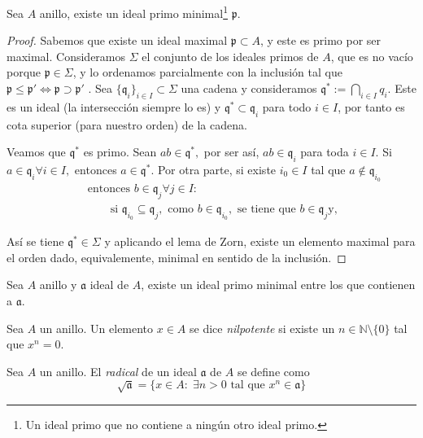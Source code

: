 \documentclass[./main.tex]{subfiles}
\begin{document}
\begin{proposition}
Sea $A$ anillo, existe un ideal primo minimal\footnote{Un ideal primo que no contiene a ningún otro ideal primo.} $\mathfrak p$.
\end{proposition}
\begin{proof}
Sabemos que existe un ideal maximal $\mathfrak{p} \subset A$, y este es primo por ser maximal. Consideramos $\Sigma$ el conjunto de los ideales primos de $A$, que es no vacío porque $\mathfrak p \in \Sigma$, y lo ordenamos parcialmente con la inclusión tal que $\mathfrak p \leq \mathfrak p' \iff \mathfrak p \supset \mathfrak p'$ . Sea $\{\mathfrak{q}_{i}\}_{i \in I} \subset \Sigma$ una cadena y consideramos $\mathfrak{q}^{*}:=\bigcap_{i \in I} q_{i}$. Este es un ideal (la intersección siempre lo es) y $\mathfrak{q}^{*} \subset \mathfrak{q}_{i}$ para todo $i\in I$, por tanto es cota superior (para nuestro orden) de la cadena.

Veamos que $\mathfrak{q}^{*}$ es primo. Sean $a b \in \mathfrak{q}^{*},$ por ser así, $a b \in \mathfrak{q}_{i}$ para toda $i \in I .$ Si $a \in \mathfrak{q}_{i} \forall i \in I,$ entonces $a \in \mathfrak{q}^{*}$. Por otra parte, si existe $i_{0} \in I$ tal que $a \notin \mathfrak{q}_{i_{0}}$
$$
\begin{array}{l}
\text { entonces } b \in \mathfrak{q}_{j} \forall j \in I: \\
\qquad \text { si } \mathfrak{q}_{i_{0}} \subseteq \mathfrak{q}_{j}, \text { como } b \in \mathfrak{q}_{i_{0}}, \text { se tiene que } b \in \mathfrak{q}_{j} \mathrm{y},
\end{array}
$$

Así se tiene $\mathfrak q^* \in \Sigma$ y aplicando el lema de Zorn, existe un elemento maximal para el orden dado, equivalemente, minimal en sentido de la inclusión.
\end{proof}

\begin{corollary}
Sea $A$ anillo y $\mathfrak a$ ideal de $A$, existe un ideal primo minimal entre los que contienen a $\mathfrak a$.
\end{corollary}

\begin{definition}
Sea $A$ un anillo. Un elemento $x\in A$ se dice \emph{nilpotente} si existe un $n\in \mathbb N \setminus \{0\}$ tal que $x^n = 0$.
\end{definition}

\begin{definition}
Sea $A$ un anillo. El \emph{radical} de un ideal $\mathfrak a$ de $A$ se define como
\[\sqrt {\mathfrak a} = \{x\in A: \; \exists n>0 \text{ tal que } x^n \in \mathfrak a \} \]
\end{definition}
\end{document}
